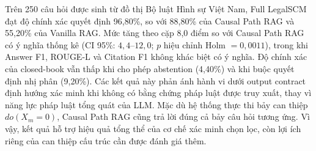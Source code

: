 Trên 250 câu hỏi được sinh từ đồ thị Bộ luật Hình sự Việt Nam, Full LegalSCM
đạt độ chính xác quyết định 96,80\%, so với 88,80\% của Causal Path RAG và
55,20\% của Vanilla RAG. Mức tăng theo cặp 8,0 điểm so với Causal Path RAG có
ý nghĩa thống kê (CI 95\%: $4{,}4$--$12{,}0$; $p$ hiệu chỉnh Holm
$=0{,}0011$), trong khi Answer F1, ROUGE-L và Citation F1 không khác biệt có ý
nghĩa. Độ chính xác của closed-book vẫn thấp khi cho phép abstention (4,40\%)
và khi buộc quyết định nhị phân (9,20\%). Các kết quả này phản ánh hành vi dưới
output contract định hướng xác minh khi không có bằng chứng pháp luật được truy
xuất, thay vì năng lực pháp luật tổng quát của LLM. Mặc dù hệ thống thực thi
bảy can thiệp $do(X_m=0)$, Causal Path RAG cũng trả lời đúng cả bảy câu hỏi
tương ứng. Vì vậy, kết quả hỗ trợ hiệu quả tổng thể của cơ chế xác minh chọn
lọc, còn lợi ích riêng của can thiệp cấu trúc cần được đánh giá thêm.
